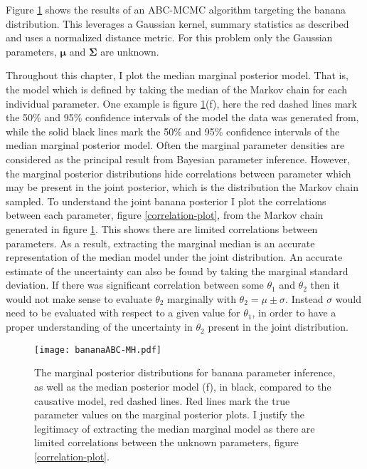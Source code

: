 Figure \ref{MH-banana} shows the results of an ABC-MCMC algorithm targeting the banana distribution. This leverages a Gaussian kernel, summary statistics as described and uses a normalized distance metric. For this problem only the Gaussian parameters, $\bm{\mu}$ and $\bm{\Sigma}$ are unknown.\par

Throughout this chapter, I plot the median marginal posterior model. That is, the model which is defined by taking the median of the Markov chain for each individual parameter. One example is figure \ref{MH-banana}(f), here the red dashed lines mark the 50\% and 95\% confidence intervals of the model the data was generated from, while the solid black lines mark the 50\% and 95\% confidence intervals of the median marginal posterior model. Often the marginal parameter densities are considered as the principal result from Bayesian parameter inference. However, the marginal posterior distributions hide correlations between parameter which may be present in the joint posterior, which is the distribution the Markov chain sampled. To understand the joint banana posterior I plot the correlations between each parameter, figure \ref{correlation-plot}, from the Markov chain generated in figure \ref{MH-banana}. This shows there are limited correlations between parameters. As a result, extracting the marginal median is an accurate representation of the median model under the joint distribution. An accurate estimate of the uncertainty can also be found by taking the marginal standard deviation. If there was significant correlation between some $\theta_1$ and $\theta_2$ then it would not make sense to evaluate $\theta_2$ marginally with $\theta_2 = \mu \pm \sigma$. Instead $\sigma$ would need to be evaluated with respect to a given value for $\theta_1$, in order to have a proper understanding of the uncertainty in $\theta_2$ present in the joint distribution. 


\begin{figure}[H]
	\centering
	\texttt{[image: bananaABC-MH.pdf]}
	\caption{The marginal posterior distributions for banana parameter inference, as well as the median posterior model (f), in black, compared to the causative model, red dashed lines. Red lines mark the true parameter values on the marginal posterior plots. I justify the legitimacy of extracting the median marginal model as there are limited correlations between the unknown parameters, figure \ref{correlation-plot}.}
	\label{MH-banana}
\end{figure}

